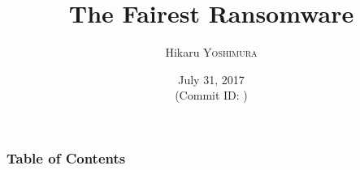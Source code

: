 \hypersetup{colorlinks,linkcolor=,urlcolor=links}

\beamertemplatenavigationsymbolsempty


\usepackage{pgfpages}
\usepackage{epigraph}
\usepackage{etoolbox}
\usepackage{tikz}
\usepackage{framed}
\usepackage{libertine}
\usepackage{amsmath}
\usepackage{mathtools}
\usepackage{listings}


\setmainfont[Ligatures=TeX]{Linux Libertine O}
\setsansfont[Ligatures=TeX]{CMU Sans Serif}
\setmonofont[Ligatures=TeX]{CMU Typewriter Text}



\title{The Fairest Ransomware}
\author[Hikaru YOSHIMURA]{%
  Hikaru \textsc{Yoshimura}
}
\date[July 31, 2017]{%
  July 31, 2017 \\%
  {\footnotesize (Commit ID: \GITAbrHash)}
}






\newcommand\ballref[1]{%
\tikz \node[circle, shade,ball color=structure.fg,inner sep=0pt,%
  text width=8pt,font=\tiny,align=center] {\color{white}\ref{#1}};
}



\frame{\maketitle}

\begin{frame}
  \frametitle{Table of Contents}

  \tableofcontents
\end{frame}

